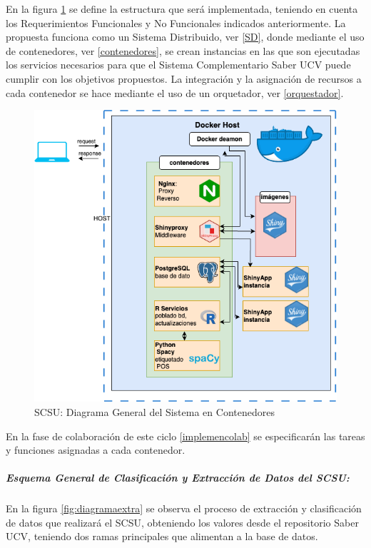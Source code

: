 \documentclass[
  12pt,
  openany]{book}
\begin{document}
En la figura \ref{fig:diagramacontenedores} se define la estructura que será implementada, teniendo en cuenta los Requerimientos Funcionales y No Funcionales indicados anteriormente. La propuesta funciona como un Sistema Distribuido, ver \ref{SD}, donde mediante el uso de contenedores, ver \ref{contenedores}, se crean instancias en las que son ejecutadas los servicios necesarios para que el Sistema Complementario Saber UCV puede cumplir con los objetivos propuestos. La integración y la asignación de recursos a cada contenedor se hace mediante el uso de un orquetador, ver \ref{orquestador}.

\begin{figure}

{\centering \includegraphics[width=0.8\linewidth]{images/05-desarrollo/4_ciclo/digrama_contenedores_modulos} 

}

\caption{SCSU: Diagrama General del Sistema en Contenedores}\label{fig:diagramacontenedores}
\end{figure}

En la fase de colaboración de este ciclo \ref{implemencolab} se especificarán las tareas y funciones asignadas a cada contenedor.

\hypertarget{esquema-general-de-clasificaciuxf3n-y-extracciuxf3n-de-datos-del-scsu}{%
\subparagraph{Esquema General de Clasificación y Extracción de Datos del SCSU:}\label{esquema-general-de-clasificaciuxf3n-y-extracciuxf3n-de-datos-del-scsu}}

En la figura \ref{fig:diagramaextra} se observa el proceso de extracción y clasificación de datos que realizará el SCSU, obteniendo los valores desde el repositorio Saber UCV, teniendo dos ramas principales que alimentan a la base de datos.
\end{document}

